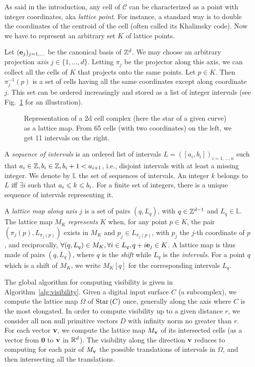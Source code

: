 As said in the introduction, any cell of $\mathcal{C}$ can be
characterized as a point with integer coordinates, aka \emph{lattice
point}. For instance, a standard way is to double the coordinates of
the centroid of the cell (often called its Khalimsky code). Now we
have to represent an arbitrary set $K$ of lattice points.

Let $(\mathbf{e}_j)_{j=1,\dots}$ be the canonical basis of $\mathbb{Z}^d$.  We may
choose an arbitrary projection \emph{axis} $j \in
\{1,\ldots,d\}$. Letting $\pi_j$ be the projector along this axis, we
can collect all the cells of $K$ that projects onto the same
points. Let $p \in K$. Then $\pi^{-1}_j(p)$ is a set of cells having
all the same coordinates except along coordinate $j$. This set can be
ordered increasingly and stored as a list of integer intervals (see
Fig.~\ref{fig:lattice-representation} for an illustration).

\begin{figure}[t]
  \centering
  
  \caption{\label{fig:lattice-representation} Representation of a
    2d cell complex (here the star of a given curve) as a lattice
    map. From 65 cells (with two coordinates) on the left, we get 11
    intervals on the right.}
\end{figure}


A \emph{sequence of intervals} is an ordered list of intervals $L =
([a_i,b_i])_{i=1,\ldots,n}$ such that $a_i \in \mathbb{Z}, b_i \in \mathbb{Z}, b_i + 1
< a_{i+1}$, i.e., disjoint intervals with at least a missing
integer. We denote by $\mathbb{L}$ the set of sequences of
intervals. An integer $k$ belongs to $L$ iff $\exists i$ such that
$a_i \leqslant k \leqslant b_i$. For a finite set of integers, there is a unique
sequence of intervals representing it.

A \emph{lattice map along axis $j$} is a set of pairs $(q,L_q)$, with
$q \in \mathbb{Z}^{d-1}$ and $L_q \in \mathbb{L}$. The lattice map $M_K$
\emph{represents} $K$ when, for any point $p \in K$, the pair
$(\pi_j(p), L_{\pi_j(p)})$ exists in $M_K$ and $p_j \in L_{\pi_j(p)}$,
with $p_j$ the $j$-th coordinate of $p$, and reciprocally, $\forall
(q,L_q) \in M_K, \forall i \in L_q, q+i\mathbf{e}_j \in K$. A lattice map is
thus made of pairs $(q,L_q)$, where $q$ is the \emph{shift} while
$L_q$ is the \emph{intervals}. For a point $q$ which is a shift of
$M_K$, we write $M_K[q]$ for the corresponding intervals $L_q$.

The global algorithm for computing visibility is given in
Algorithm~\ref{alg:visibility}.  Given a digital input surface $C$ (a
subcomplex), we compute the lattice map $\Omega$ of $\mathrm{Star}\left(C\right)$ once,
generally along the axis where $C$ is the most elongated. In order to
compute visibility up to a given distance $r$, we consider all non
null primitive vectors $D$ with infinity norm no greater than $r$.
For each vector $\mathbf{v}$, we compute the lattice map $M_{\mathbf{v}}$ of its
intersected cells (as a vector from $\mathbf{0}$ to $\mathbf{v}$ in
$\mathbb{R}^d$). The visibility along the direction $\mathbf{v}$ reduces to computing
for each pair of $M_{\mathbf{v}}$ the possible translations of intervals in
$\Omega$, and then intersecting all the translations.

